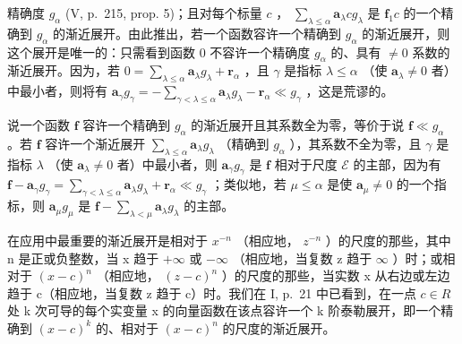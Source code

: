 精确度 \(g_{\alpha}\) (V, p.~215, prop. 5)；且对每个标量 \(c\) ， \(\sum_{\lambda \leqslant \alpha} \mathbf{a}_{\lambda}cg_{\lambda}\) 是 \(\mathbf{f}_1c\) 的一个精确到 \(g_{\alpha}\) 的渐近展开。由此推出，若一个函数容许一个精确到 \(g_{\alpha}\) 的渐近展开，则这个展开是唯一的：只需看到函数 0 不容许一个精确度 \(g_{\alpha}\) 的、具有 \(\neq 0\) 系数的渐近展开。因为，若 \(0 = \sum_{\lambda \leqslant \alpha} \mathbf{a}_{\lambda}g_{\lambda} + \mathbf{r}_{\alpha}\) ，且 \(\gamma\) 是指标 \(\lambda \leqslant \alpha\) （使 \(\mathbf{a}_{\lambda} \neq 0\) 者）中最小者，则将有 \(\mathbf{a}_{\gamma}g_{\gamma} = -\sum_{\gamma < \lambda \leqslant \alpha} \mathbf{a}_{\lambda}g_{\lambda} - \mathbf{r}_{\alpha} \ll g_{\gamma}\) ，这是荒谬的。

说一个函数 \(\mathbf{f}\) 容许一个精确到 \(g_{\alpha}\) 的渐近展开且其系数全为零，等价于说 \(\mathbf{f} \ll g_{\alpha}\) 。若 \(\mathbf{f}\) 容许一个渐近展开 \(\sum_{\lambda \leqslant \alpha} \mathbf{a}_{\lambda} g_{\lambda}\) （精确到 \(g_{\alpha}\) ），其系数不全为零，且 \(\gamma\) 是指标 \(\lambda\) （使 \(\mathbf{a}_{\lambda} \neq 0\) 者）中最小者，则 \(\mathbf{a}_{\gamma} g_{\gamma}\) 是 \(\mathbf{f}\) 相对于尺度 \(\mathcal{E}\) 的主部，因为有 \(\mathbf{f} - \mathbf{a}_{\gamma} g_{\gamma} = \sum_{\gamma < \lambda \leqslant \alpha} \mathbf{a}_{\lambda} g_{\lambda} + \mathbf{r}_{\alpha} \ll g_{\gamma}\) ；类似地，若 \(\mu \leqslant \alpha\) 是使 \(\mathbf{a}_{\mu} \neq 0\) 的一个指标，则 \(\mathbf{a}_{\mu} g_{\mu}\) 是 \(\mathbf{f} - \sum_{\lambda < \mu} \mathbf{a}_{\lambda} g_{\lambda}\) 的主部。

在应用中最重要的渐近展开是相对于 \(x^{-n}\) （相应地， \(z^{-n}\) ）的尺度的那些，其中 n 是正或负整数，当 x 趋于 \(+\infty\) 或 \(-\infty\) （相应地，当复数 z 趋于 \(\infty\) ）时；或相对于 \((x - c)^{n}\) （相应地， \((z - c)^{n}\) ）的尺度的那些，当实数 x 从右边或左边趋于 c（相应地，当复数 z 趋于 c）时。我们在 I, p.~21 中已看到，在一点 \(c \in R\) 处 k 次可导的每个实变量 x 的向量函数在该点容许一个 k 阶泰勒展开，即一个精确到 \((x - c)^{k}\) 的、相对于 \((x - c)^{n}\) 的尺度的渐近展开。

